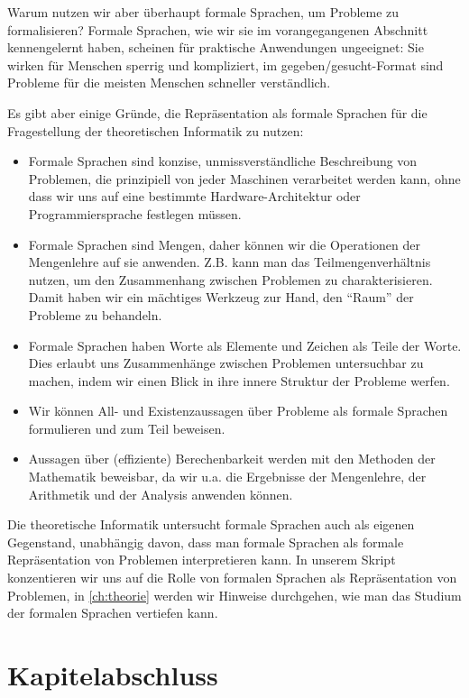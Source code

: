 Warum nutzen wir aber überhaupt formale Sprachen,
um Probleme zu formalisieren?
Formale Sprachen,
wie wir sie im vorangegangenen Abschnitt kennengelernt haben,
scheinen für praktische Anwendungen ungeeignet:
Sie wirken für Menschen sperrig und kompliziert,
im gegeben/gesucht-Format sind Probleme für die meisten Menschen schneller verständlich.

Es gibt aber einige Gründe,
die Repräsentation als formale Sprachen
für die Fragestellung der theoretischen Informatik zu nutzen:
\begin{itemize}
    \item Formale Sprachen sind konzise, unmissverständliche Beschreibung von Problemen,
        die prinzipiell von jeder Maschinen verarbeitet werden kann,
        ohne dass wir uns auf eine bestimmte Hardware-Architektur oder Programmiersprache
        festlegen müssen.
    \item Formale Sprachen sind Mengen, daher können wir die Operationen der Mengenlehre
        auf sie anwenden.
        Z.B. kann man das Teilmengenverhältnis nutzen,
        um den Zusammenhang zwischen Problemen zu charakterisieren.
        Damit haben wir ein mächtiges Werkzeug zur Hand,
        den ``Raum'' der Probleme zu behandeln.
    \item Formale Sprachen haben Worte als Elemente und Zeichen als Teile der Worte.
        Dies erlaubt uns Zusammenhänge zwischen Problemen untersuchbar zu machen,
        indem wir einen Blick in ihre innere Struktur der Probleme werfen.
    \item Wir können All- und Existenzaussagen über Probleme als formale Sprachen formulieren
        und zum Teil beweisen.
    \item Aussagen über (effiziente) Berechenbarkeit werden mit den Methoden der Mathematik
        beweisbar, da wir u.a. die Ergebnisse der Mengenlehre, der Arithmetik
        und der Analysis anwenden können.
\end{itemize}

Die theoretische Informatik untersucht formale Sprachen auch als eigenen Gegenstand,
unabhängig davon, dass man formale Sprachen als formale Repräsentation von Problemen
interpretieren kann.
In unserem Skript konzentieren wir uns auf die Rolle von formalen Sprachen als
Repräsentation von Problemen,
in \autoref{ch:theorie} werden wir Hinweise durchgehen,
wie man das Studium der formalen Sprachen vertiefen kann.

\section{Kapitelabschluss}
